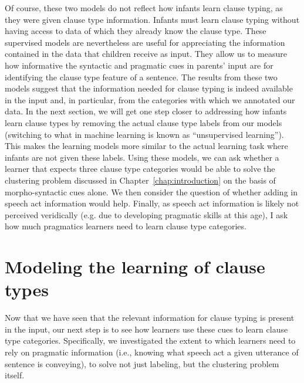 
Of course, these two models do not reflect how infants learn clause typing, as they were given clause type information. Infants must learn clause typing without having access to data of which they already know the clause type. These supervised models are nevertheless are useful for appreciating the information contained in the data that children receive as input. They allow us to measure how informative the syntactic and pragmatic cues in parents' input are for identifying the clause type feature of a sentence. The results from these two models suggest that the information needed for clause typing is indeed available in the input and, in particular, from the categories with which we annotated our data. In the next section, we will get one step closer to addressing how infants learn clause types by removing the actual clause type labels from our models (switching to what in machine learning is known as ``unsupervised learning''). This makes the learning models more similar to the actual learning task where infants are not given these labels. Using these models, we can ask whether a learner that expects three clause type categories would be able to solve the clustering problem discussed in Chapter~\ref{chap:introduction} on the basis of morpho-syntactic cues alone. We then consider the question of whether adding in speech act information would help. Finally, as speech act information is likely not perceived veridically (e.g. due to developing pragmatic skills at this age), I ask how much pragmatics learners need to learn clause type categories. 


\section{Modeling the learning of clause types}
\label{sec:engcl:model}
Now that we have seen that the relevant information for clause typing is present in the input, our next step is to see how learners use these cues to learn clause type categories. Specifically, we investigated the extent to which learners need to rely on pragmatic information (i.e., knowing what speech act a given utterance of sentence is conveying), to solve not just labeling, but the clustering problem itself. 


